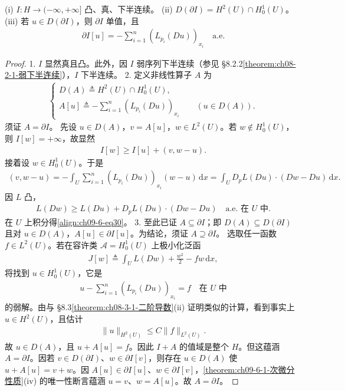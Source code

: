 \documentclass[../../main.tex]{subfiles}
\begin{document}
\begin{theorem}\label{theorem:ch09-6-4-次微分刻画}
(i) $I:H\to(-\infty,+\infty]$ 凸、真、下半连续。
(ii) $D(\partial I)=H^2(U)\cap H_0^1(U)$。
(iii) 若 $u\in D(\partial I)$，则 $\partial I$ 单值，且
\begin{align*}
\partial I[u]=-\sum_{i=1}^n(L_{p_i}(Du))_{x_i}\quad\text{a.e.}
\end{align*}
\begin{proof}
1. $I$ 显然真且凸。此外，因 $I$ 弱序列下半连续（参见 \S8.2.2\cref{theorem:ch08-2-1-弱下半连续}），$I$ 下半连续。
2. 定义非线性算子 $A$ 为
\begin{align*}
\begin{cases}D(A)\triangleq H^2(U)\cap H_0^1(U),\\ A[u]\triangleq-\sum_{i=1}^n(L_{p_i}(Du))_{x_i}\qquad (u\in D(A)).\end{cases}
\end{align*}
须证 $A=\partial I$。
先设 $u\in D(A)$，$v=A[u]$，$w\in L^2(U)$。若 $w\notin H_0^1(U)$，则 $I[w]=+\infty$，故显然
\begin{align}
I[w]\geqslant I[u]+(v,w-u).\label{align:ch09-6-eq30}
\end{align}
接着设 $w\in H_0^1(U)$。于是
\begin{align*}
(v,w-u)=-\int_U\sum_{i=1}^n(L_{p_i}(Du))_{x_i}(w-u)\,\mathrm{d}x=\int_U D_pL(Du)\cdot(Dw-Du)\,\mathrm{d}x.
\end{align*}
因 $L$ 凸，
\begin{align*}
L(Dw)\geqslant L(Du)+D_pL(Du)\cdot(Dw-Du)\quad\text{a.e. 在 }U\text{ 中}.
\end{align*}
在 $U$ 上积分得\eqref{align:ch09-6-eq30}。
3. 至此已证 $A\subseteq\partial I$；即 $D(A)\subseteq D(\partial I)$ 且对 $u\in D(A)$，$A[u]\in\partial I[u]$。为结论，须证 $A\supseteq\partial I$。
选取任一函数 $f\in L^2(U)$。若在容许类 $\mathcal{A}=H_0^1(U)$ 上极小化泛函
\begin{align*}
J[w]\triangleq\int_U L(Dw)+\frac{w^2}2-fw\,\mathrm{d}x,
\end{align*}
将找到 $u\in H_0^1(U)$，它是
\begin{align}
u-\sum_{i=1}^n(L_{p_i}(Du))_{x_i}=f\quad\text{在 }U\text{ 中}\label{align:ch09-6-eq31}
\end{align}
的弱解。由与 \S8.3\cref{theorem:ch08-3-1-二阶导数}(ii) 证明类似的计算，看到事实上 $u\in H^2(U)$，且估计
\begin{align}
\|u\|_{H^2(U)}\leqslant C\|f\|_{L^2(U)}.\label{align:ch09-6-eq32}
\end{align}
故 $u\in D(A)$，且 $u+A[u]=f$。因此 $I+A$ 的值域是整个 $H$。但这蕴涵 $A=\partial I$。因若 $v\in D(\partial I)$、$w\in\partial I[v]$，则存在 $u\in D(A)$ 使 $u+A[u]=v+w$。因 $A[u]\in\partial I[u]$、$w\in\partial I[v]$，\cref{theorem:ch09-6-1-次微分性质}(iv) 的唯一性断言蕴涵 $u=v$、$w=A[u]$。故 $A=\partial I$。
\end{proof}
\end{theorem}
\end{document}
